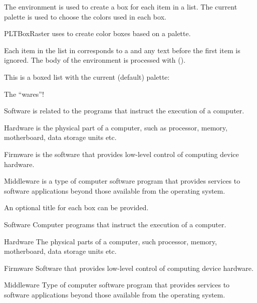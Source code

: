 \documentclass[a4paper, 11pt]{article}
\begin{document}
The environment  is used to create a box for each item in a list. The current palette is used to choose the colors used in each box.

\begin{environment}{PLTBoxRaster}{}
     uses  to create color boxes based on a palette.

    Each item in the list in  corresponds to a  and any text before the first item is ignored. The body of the environment is processed with  ().


    \begin{example}{}
        This is a boxed list with the current (default) palette:

        \begin{PLTBoxRaster}
            The ``wares''! %
            \item Software is related to the programs that instruct the execution of a computer.
            \item Hardware is the physical part of a computer, such as processor, memory, motherboard, data storage units etc.
            \item Firmware is the software that provides low-level control of computing device hardware.
            \item Middleware is a type of computer software program that provides services to software applications beyond those available from the operating system.
        \end{PLTBoxRaster}
    \end{example}

    An optional title for each box can be provided.

    \begin{example}{}
        \begin{PLTBoxRaster}
            \item[Software] Computer programs that instruct the execution of a computer.
            \item[Hardware] The physical parts of a computer, such processor, memory, motherboard, data storage units etc.
            \item[Firmware] Software that provides low-level control of computing device hardware.
            \item[Middleware] Type of computer software program that provides services to software applications beyond those available from the operating system.
        \end{PLTBoxRaster}
    \end{example}
\end{environment}
\end{document}
